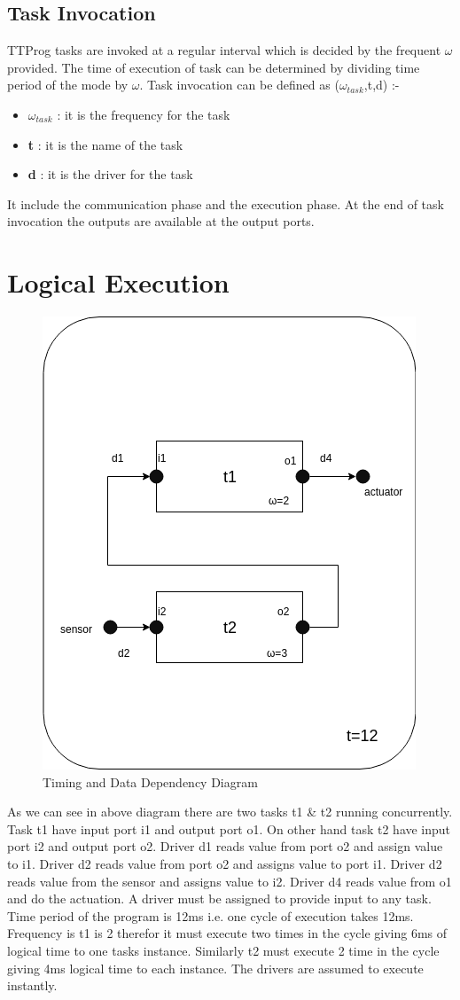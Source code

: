 \documentclass[16pt]{report}
\begin{document}
\subsection{Task Invocation}
TTProg tasks are invoked at a regular interval which is decided by the frequent $\omega$ provided. The time of execution of task can be determined by dividing time period of the mode by $\omega$. Task invocation can be defined as ($\omega_{task}$,t,d) :-
\begin{itemize}
    \item \textbf{$\omega_{task}$} : it is the frequency for the task
    \item \textbf{t} : it is the name of the task
    \item \textbf{d} : it is the driver for the task
\end{itemize}{}
It include the communication phase and the execution  phase. At the end of task invocation the outputs are available at the output ports.


\section{Logical Execution}
\begin{figure}[H]
\centering
\includegraphics[width=0.6\linewidth]{24timingData.png}
\caption{Timing and Data Dependency Diagram}
\end{figure}

As we can see in above diagram there are two tasks t1 \& t2 running concurrently. Task t1 have input port i1 and output port o1. On other hand task t2 have input port i2 and output port o2. Driver d1 reads value from port o2 and assign value to i1. Driver d2 reads value from port o2 and assigns value to port i1. Driver d2 reads value from the sensor and assigns value to i2. Driver d4 reads value from o1 and do the actuation.
A driver must be assigned to provide input to any task. \\
Time period of the program is 12ms i.e. one cycle of execution takes 12ms. Frequency is t1 is 2 therefor it must execute two times in the cycle giving 6ms of logical time to one tasks instance. Similarly t2 must execute 2 time in the cycle giving 4ms logical time to each instance. The drivers are assumed to execute instantly.
\end{document}
